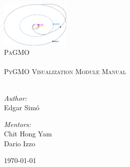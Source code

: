 \begin{titlepage}

\begin{center}

\vspace{2 cm}

\includegraphics[width=0.25\textwidth]{img/cover}\\[1cm]

\textsc{\LARGE PaGMO}\\[0.5cm]
\HRule \\[0.5cm]
\textsc{\Large PyGMO Visualization Module Manual}\\[0.5cm]
\HRule \\[1.5cm]


\begin{minipage}{0.4\textwidth}
\begin{flushleft} \large
\emph{Author:}\\
Edgar Sim\'{o}
\end{flushleft}
\end{minipage}
\begin{minipage}{0.4\textwidth}
\begin{flushright} \large
\emph{Mentors:} \\
Chit Hong Yam \\
Dario Izzo
\end{flushright}
\end{minipage}

\vfill

{\large \today}

\end{center}

\end{titlepage}
